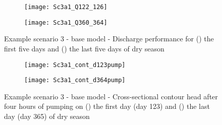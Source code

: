 \begin{figure}[H]
	\centering
	\begin{subfigure}[b]{0.5\linewidth}
		\centering\texttt{[image: Sc3a1\_Q122\_126]}
		\captionsetup{justification=centering}		
		\caption{\label{fig:Sc3a1_Q122_126}}
		\end{subfigure}\hfill
	\begin{subfigure}[b]{0.5\linewidth}
        \centering\texttt{[image: Sc3a1\_Q360\_364]}
		\captionsetup{justification=centering}		
		\caption{\label{fig:Sc3a1_Q360_364}}
		\end{subfigure}
		\captionsetup{justification=centering}	
	\caption{Example scenario 3 - base model - Discharge performance for   () the first five days and () the last five days of dry season} 
	\label{fig:Example_Sc3_base_discharge}
\end{figure} 



\begin{figure}[h!]
	\centering
	\begin{subfigure}[b]{0.5\linewidth}
		\centering\texttt{[image: Sc3a1\_cont\_d123pump]}
		\captionsetup{justification=centering}		
		\caption{\label{fig:Sc3a1_cont_d123pump}}
		\end{subfigure}\hfill
	\begin{subfigure}[b]{0.5\linewidth}
        \centering\texttt{[image: Sc3a1\_cont\_d364pump]}
		\captionsetup{justification=centering}		
		\caption{\label{fig:Sc3a1_cont_d364pump}}
		\end{subfigure}
		\captionsetup{justification=centering}	
	\caption{Example scenario 3 - base model - Cross-sectional contour head after four hours of pumping on () the first day (day 123) and () the last day (day 365) of dry season} 
	\label{fig:Example_Sc3_base_cont_dry}
\end{figure} 

